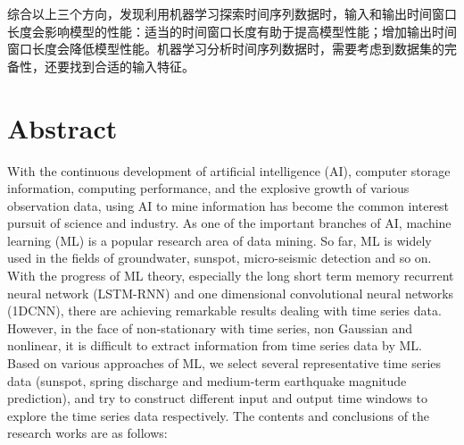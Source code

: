\begin{enumerate}
  综合以上三个方向，发现利用机器学习探索时间序列数据时，输入和输出时间窗口长度会影响模型的性能：适当的时间窗口长度有助于提高模型性能；增加输出时间窗口长度会降低模型性能。机器学习分析时间序列数据时，需要考虑到数据集的完备性，还要找到合适的输入特征。

\end{enumerate}


\intobmk\chapter*{Abstract}
With the continuous development of artificial intelligence (AI), computer storage information, computing performance, and the explosive growth of various observation data, using AI to mine information has become the common interest pursuit of science and industry. As one of the important branches of AI, machine learning (ML) is a popular research area of data mining. So far, ML is widely used in the fields of groundwater, sunspot, micro-seismic detection and so on. With the progress of ML theory, especially the long short term memory recurrent neural network (LSTM-RNN) and one dimensional convolutional neural networks (1DCNN), there are achieving remarkable results dealing with time series data. However, in the face of non-stationary with time series, non Gaussian and nonlinear, it is difficult to extract information from time series data by ML. Based on various approaches of ML, we select several representative time series data (sunspot, spring discharge and medium-term earthquake magnitude prediction), and try to construct different input and output time windows to explore the time series data respectively. The contents and conclusions of the research works are as follows:
